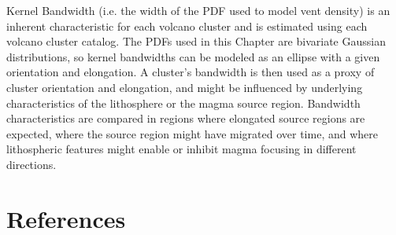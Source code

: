 Kernel Bandwidth (i.e. the width of the PDF used to model vent density) is an inherent characteristic for each volcano cluster and is estimated using each volcano cluster catalog. The PDFs used in this Chapter are bivariate Gaussian distributions, so kernel bandwidths can be modeled as an ellipse with a given orientation and elongation. A cluster's bandwidth is then used as a proxy of cluster orientation and elongation, and might be influenced by underlying characteristics of the lithosphere or the magma source region. Bandwidth characteristics are compared in regions where elongated source regions are expected, where the source region might have migrated over time, and where lithospheric features might enable or inhibit magma focusing in different directions.


\section{References}
